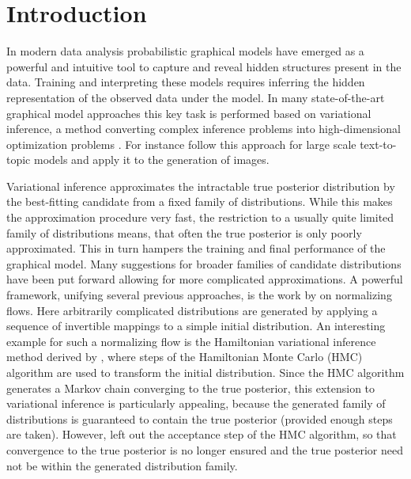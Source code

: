 \section{Introduction}

In modern data analysis probabilistic graphical models have emerged as a powerful and intuitive tool to capture and reveal hidden structures present in the data. Training and interpreting these models requires inferring the hidden representation of the observed data under the model. In many state-of-the-art graphical model approaches this key task is performed based on variational inference, a method converting complex inference problems into high-dimensional optimization problems \parencite{Jordan1999}. For instance \parencite{Hoffman2013} follow this approach for large scale text-to-topic models and \parencite{Gregor2015, Rezende2014, Kingma2014} apply it to the generation of images. 

Variational inference approximates the intractable true posterior distribution by the best-fitting candidate from a fixed family of distributions. While this makes the approximation procedure very fast, the restriction to a usually quite limited family of distributions means, that often the true posterior is only poorly approximated. This in turn hampers the training and final performance of the graphical model. Many suggestions for broader families of candidate distributions have been put forward allowing for more complicated approximations. A powerful framework, unifying several previous approaches, is the work by \parencite{Rezende2015} on normalizing flows. Here arbitrarily complicated distributions are generated by applying a sequence of invertible mappings to a simple initial distribution. An interesting example for such a normalizing flow is the Hamiltonian variational inference method derived by \parencite{Salimans2014}, where steps of the Hamiltonian Monte Carlo (HMC) algorithm are used to transform the initial distribution. Since the HMC algorithm generates a Markov chain converging to the true posterior, this extension to variational inference is particularly appealing, because the generated family of distributions is guaranteed to contain the true posterior (provided enough steps are taken). However, \parencite{Salimans2014} left out the acceptance step of the HMC algorithm, so that convergence to the true posterior is no longer ensured and the true posterior need not be within the generated distribution family.

